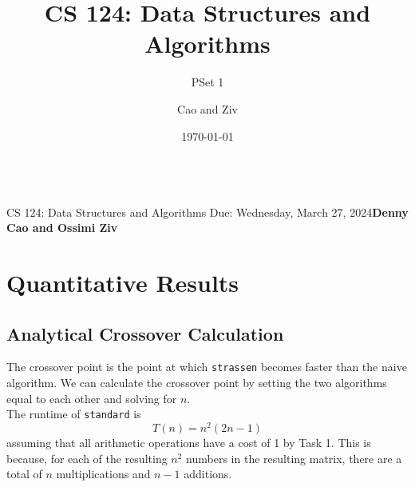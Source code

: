 \documentclass[11pt]{scrartcl}
\title{CS 124: Data Structures and Algorithms}
\subtitle{PSet 1}
\author{Cao and Ziv}
\date{\today}
\title{\psetName}
\makeatletter
\theoremstyle{dotlessP}
\theoremstyle{dotlessN}
\theoremstyle{dotN}
\newcommand{\courseNumber}{CS 124}
\newcommand{\courseName}{Data Structures and Algorithms}
\newcommand{\dueDate}{Due: Wednesday, March 27, 2024}
\newcommand{\name}{Denny Cao and Ossimi Ziv}
\renewcommand{\maketitle}{\bgroup\setlength{\parindent}{0pt}
    \begin{flushleft}
        {\Large\textbf{\@title}} \\ \vskip0.2cm
        \begingroup
            \fontsize{12pt}{12pt}\selectfont
            \courseNumber: \courseName 
        \endgroup \vskip0.3cm
        \dueDate \hfill\rlap{}\textbf{\name} \\ \vskip0.1cm
        \hrulefill
    \end{flushleft}\egroup 
}
\makeatother
\begin{document}
\maketitle
\thispagestyle{plain}

\section{Quantitative Results}
\subsection{Analytical Crossover Calculation}
The crossover point is the point at which \texttt{strassen} becomes faster than the naive algorithm. We can calculate the crossover point by setting the two algorithms equal to each other and solving for $n$.
\\

The runtime of \texttt{standard} is
\[
T(n)=n^2(2n-1)
\] 
assuming that all arithmetic operations
have a cost of 1 by Task 1. This is because, for each of the resulting $n^2$ numbers in the resulting matrix, there
are a total of $n$ multiplications and $n-1$ additions.
\\
\end{document}
